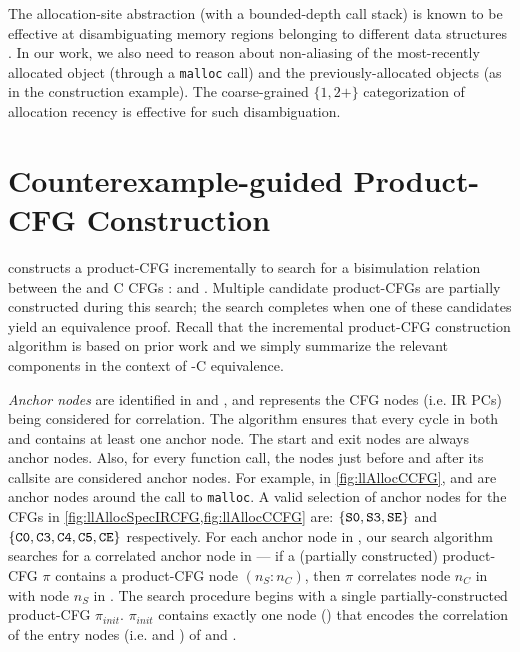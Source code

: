 The allocation-site abstraction (with a bounded-depth call stack) is
known to be effective at disambiguating memory regions belonging to
different data structures
\cite{allocationSiteAbstraction82,allocationSiteAbstraction90,allocationSiteAbstraction06}.
In our work, we also need to reason about non-aliasing
of the most-recently allocated object (through a {\tt malloc} call) and
the previously-allocated objects (as in the 
construction example). The coarse-grained $\{1, 2+\}$
categorization of allocation recency is effective for such disambiguation.



\section{Counterexample-guided Product-CFG Construction}
\label{sec:searchalgo}
\toolName{} constructs a product-CFG incrementally to search for a bisimulation relation
between the \SpecL{} and C CFGs : \sprog{} and \cprog{}.
Multiple candidate product-CFGs are partially constructed during this search;
the search completes when one of these candidates yield an equivalence proof.
Recall that the incremental product-CFG construction algorithm is based on prior work \cite{shubhanipdhthesis}
and we simply summarize the relevant components in the context of \SpecL{}-C equivalence.

{\em Anchor nodes} are identified in \sprog{} and \cprog{}, and represents the
CFG nodes (i.e. IR PCs) being considered for correlation.
The algorithm ensures that every cycle in both \sprog{} and \cprog{} contains at least one anchor node.
The start and exit nodes are always anchor nodes.
Also, for every function call, the nodes just before and after its callsite are considered anchor nodes.
For example, in \cref{fig:llAllocCCFG},  and  are anchor nodes around the call to {\tt malloc}.
A valid selection of anchor nodes for the CFGs in \cref{fig:llAllocSpecIRCFG,fig:llAllocCCFG} are:
$\{ {\tt S0},{\tt S3},{\tt SE} \}$ and $\{ {\tt C0}, {\tt C3}, {\tt C4}, {\tt C5}, {\tt CE} \}$ respectively.
For each anchor node in \cprog{}, our search algorithm searches for a correlated anchor node in \sprog{} --- if
a (partially constructed) product-CFG $\pi$ contains a product-CFG node  $(n_S\!:\!n_C)$, then $\pi$
correlates node $n_C$ in \cprog{} with node $n_S$ in \sprog{}.
The search procedure begins with a single partially-constructed product-CFG $\pi_{init}$.
$\pi_{init}$ contains exactly one node () that encodes the correlation of the entry nodes
(i.e.  and ) of \sprog{} and \cprog{}.

